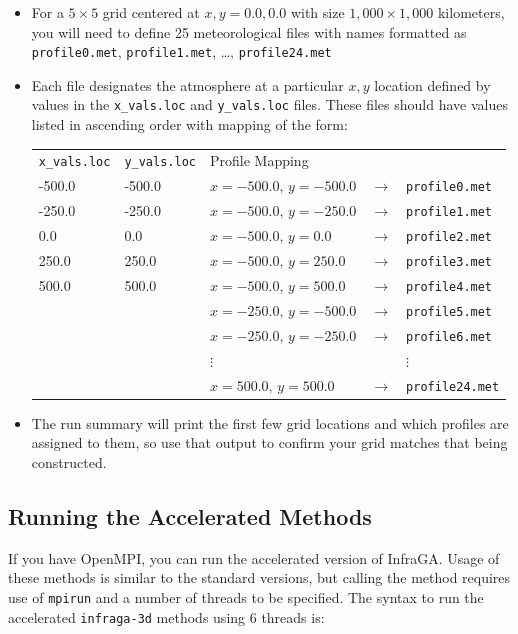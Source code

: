 \documentclass[10pt]{article}
\begin{document}
\begin{itemize}
 \item For a \(5 \times 5 \) grid centered at \(x, y = 0.0, 0.0\) with size \(1,000 \times 1,000 \) kilometers, you will need to define 25 meteorological files with names formatted as \verb=profile0.met=, \verb=profile1.met=, \ldots, \verb=profile24.met=
 \item Each file designates the atmosphere at a particular \(x, y\) location defined by values in the \verb=x_vals.loc= and \verb=y_vals.loc= files.  These files should have values listed in ascending order with mapping of the form:

\begin{centering}
 \begin{tabular}{l l l c l}
  \verb=x_vals.loc=	& \verb=y_vals.loc= \hspace*{25pt} 	& Profile Mapping \\
  -500.0			& -500.0			& \(x = -500.0, \, y = -500.0 \) 	& \(\rightarrow \) 	& \verb=profile0.met= \\
  -250.0			& -250.0			& \(x = -500.0, \, y = -250.0 \) 	& \( \rightarrow \) 	& \verb=profile1.met= \\
  0.0				& 0.0				& \(x = -500.0, \, y = 0.0 \) 		& \( \rightarrow \) 	& \verb=profile2.met= \\
  250.0			& 250.0			& \(x = -500.0, \, y = 250.0 \)	& \( \rightarrow \) 	& \verb=profile3.met= \\
  500.0			& 500.0			& \(x = -500.0, \, y = 500.0 \)	& \( \rightarrow \) 	& \verb=profile4.met= \\
 				& 				& \(x = -250.0, \, y = -500.0 \)	& \( \rightarrow \) 	& \verb=profile5.met= \\
 				& 				& \(x = -250.0, \, y = -250.0 \)	& \( \rightarrow \) 	& \verb=profile6.met= \\
  				& 				& \(\vdots\)				& 				& \(\vdots\) \\
  				& 				& \(x = 500.0, \, y = 500.0 \)	& \( \rightarrow \) 	& \verb=profile24.met= \\
 \end{tabular}
 \end{centering}
 \item The run summary will print the first few grid locations and which profiles are assigned to them, so use that output to confirm your grid matches that being constructed.
\end{itemize}

\subsection{Running the Accelerated Methods}
 \label{Sect:Clarifications:Accel}
 If you have OpenMPI, you can run the accelerated version of InfraGA.  Usage of these methods is similar to the standard versions, but calling the method requires use of \verb=mpirun= and a number of threads to be specified.  The syntax to run the accelerated \verb=infraga-3d= methods using 6 threads is:\\
 
\end{document}
